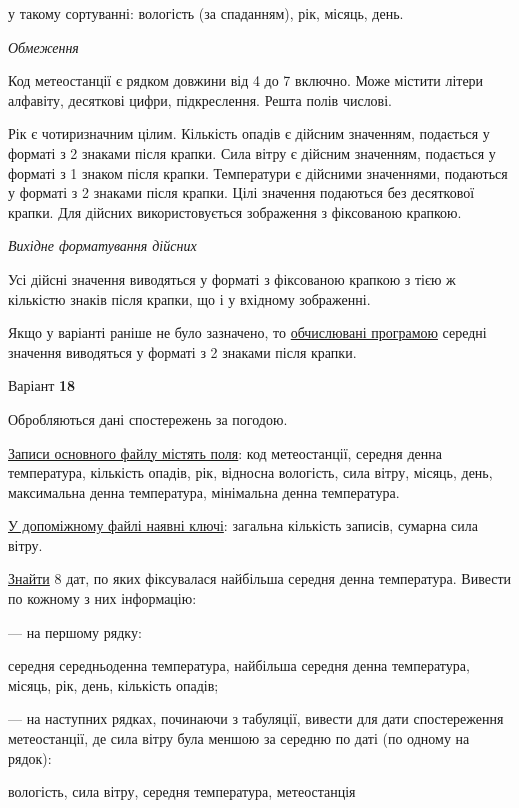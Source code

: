 \documentclass[11pt, ukrainian]{article}
\begin{document}
{\noindent}у такому сортуванні: вологість (за спаданням), рік, місяць, день.


\bigskip\textit{Обмеження}

Код метеостанції є рядком довжини від 4 до 7 включно.
Може містити літери алфавіту, десяткові цифри, підкреслення. Решта полів числові.

Рік є чотиризначним цілим.
Кількість опадів є дійсним значенням, подається у форматі з 2 знаками після крапки.
Сила вітру є дійсним значенням, подається у форматі з 1 знаком після крапки.
Температури є дійсними значеннями, подаються у форматі з 2 знаками після крапки.
Цілі значення подаються без десяткової крапки.
Для дійсних використовується зображення з фіксованою крапкою.

\textit{Вихідне форматування дійсних}

Усі дійсні значення виводяться у форматі з фіксованою крапкою з тією ж кількістю знаків після крапки, що і у вхідному зображенні.

Якщо у варіанті раніше не було зазначено, то \underline{обчислювані програмою} середні значення виводяться у форматі з 2 знаками після крапки.


\par
\newpage
{\center Варіант  \No \textbf { 18 }\par}
\bigskip
Обробляються дані спостережень за погодою. 

\underline{Записи основного файлу містять поля}: код метеостанції, середня денна температура, кількість опадів, рік, відносна вологість, сила вітру, місяць, день, максимальна денна температура, мінімальна денна температура.

\underline{У допоміжному файлі наявні ключі}: загальна кількість записів, сумарна сила вітру.

\underline{Знайти} 8 дат, по яких фіксувалася найбільша середня денна температура. Вивести по кожному з них інформацію:\par
{\noindent}--- на першому рядку:\par
середня середньоденна температура, найбільша середня денна температура, місяць, рік, день, кількість опадів;

{\noindent}--- на наступних рядках, починаючи з табуляції, вивести для дати спостереження метеостанції, де сила вітру була меншою за середню по даті (по одному на рядок):\par
вологість, сила вітру, середня температура, метеостанція
\end{document}
